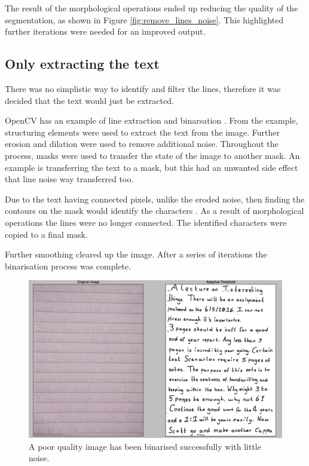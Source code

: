 The result of the morphological operations ended up reducing the quality of the segmentation, as shown in Figure \ref{fig:remove_lines_noise}. This highlighted further iterations were needed for an improved output.

\subsection{Only extracting the text}
There was no simplistic way to identify and filter the lines, therefore it was decided that the text would just be extracted.

OpenCV has an example of line extraction and binarsation \cite{citeulike:14006256}. From the example, structuring elements were used to extract the text from the image. Further erosion and dilation were used to remove additional noise. Throughout the process, masks were used to transfer the state of the image to another mask. An example is transferring the text to a mask, but this had an unwanted side effect that line noise way transferred too.

Due to the text having connected pixels, unlike the eroded noise, then finding the contours on the mask would identify the characters \cite{citeulike:14027120} \cite{citeulike:14027122} \cite{citeulike:14027123}. As a result of  morphological operations the lines were no longer connected. The identified characters were copied to a final mask.

Further smoothing cleared up the image. After a series of iterations the binarisation process was complete.

\begin{figure}[H]
  \centering
  \includegraphics[scale=0.3]{images/hard_image}
  \caption{A poor quality image has been binarised successfully with little noise.}
  \label{fig:poor_quality}
\end{figure}

